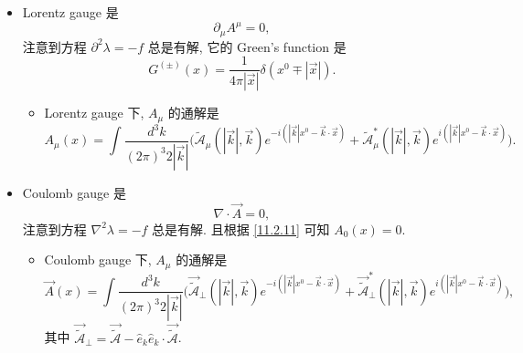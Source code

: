 \begin{itemize}
	\item Lorentz gauge 是
	\begin{equation}
		\partial_\mu A^\mu = 0,
	\end{equation}
	注意到方程 $\partial^2 \lambda = - f$ 总是有解, 它的 Green's function 是
	\begin{equation}
		G^{(\pm)}(x) = \frac{1}{4 \pi |\vec{x}|} \delta(x^0 \mp |\vec{x}|).
	\end{equation}
	\begin{itemize}
		\item Lorentz gauge 下, $A_\mu$ 的通解是
		\begin{equation}
			A_\mu(x) = \int \frac{d^3 k}{(2 \pi)^3 2 |\vec{k}|} \Big( \tilde{\mathcal{A}}_\mu(|\vec{k}|, \vec{k}) e^{- i (|\vec{k}| x^0 - \vec{k} \cdot \vec{x})} + \tilde{\mathcal{A}}^*_\mu(|\vec{k}|, \vec{k}) e^{i (|\vec{k}| x^0 - \vec{k} \cdot \vec{x})} \Big).
		\end{equation}
	\end{itemize}
	
	\item Coulomb gauge 是
	\begin{equation}
		\nabla \cdot \vec{A} = 0,
	\end{equation}
	注意到方程 $\nabla^2 \lambda = - f$ 总是有解. 且根据 \eqref{11.2.11} 可知 $A_0(x) = 0$.
	\begin{itemize}
		\item Coulomb gauge 下, $A_\mu$ 的通解是
		\begin{equation}
			\vec{A}(x) = \int \frac{d^3 k}{(2 \pi)^3 2 |\vec{k}|} \Big( \vec{\tilde{\mathcal{A}}}_\perp(|\vec{k}|, \vec{k}) e^{- i (|\vec{k}| x^0 - \vec{k} \cdot \vec{x})} + \vec{\tilde{\mathcal{A}}}^*_\perp(|\vec{k}|, \vec{k}) e^{i (|\vec{k}| x^0 - \vec{k} \cdot \vec{x})} \Big),
		\end{equation}
		其中 $\vec{\tilde{\mathcal{A}}}_\perp = \vec{\tilde{\mathcal{A}}} - \hat{e}_k \hat{e}_k \cdot \vec{\tilde{\mathcal{A}}}$.
	\end{itemize}
\end{itemize}
